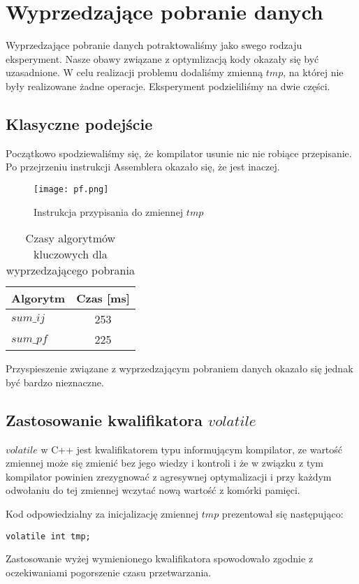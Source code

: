 \section{Wyprzedzające pobranie danych}

Wyprzedzające pobranie danych potraktowaliśmy jako swego rodzaju eksperyment. Nasze obawy związane z optymlizacją kody okazały się być uzasadnione. W celu realizacji problemu dodaliśmy zmienną $tmp$, na której nie były realizowane żadne operacje. Eksperyment podzieliliśmy na dwie części.

\subsection{Klasyczne podejście}

Początkowo spodziewaliśmy się, że kompilator usunie nic nie robiące przepisanie. Po przejrzeniu instrukcji Assemblera okazało się, że jest inaczej.

\begin{figure}[!ht]
\centering
\texttt{[image: pf.png]}
\caption{Instrukcja przypisania do zmiennej $tmp$}
\end{figure}

\begin{table}[H]
\centering
\begin{tabular}{|l|c|}
\hline
Algorytm & Czas [ms] \\ \hline
$sum\_ij$ & 253 \\ \hline
$sum\_pf$ & 225 \\ \hline
\end{tabular}
\caption{Czasy algorytmów kluczowych dla wyprzedzającego pobrania}
\end{table}

Przyspieszenie związane z wyprzedzającym pobraniem danych okazało się jednak być bardzo nieznaczne.

\subsection{Zastosowanie kwalifikatora $volatile$}

$volatile$ w C++ jest kwalifikatorem typu informującym kompilator, ze wartość zmiennej może się zmienić bez jego wiedzy i kontroli i że w związku z tym kompilator powinien zrezygnować z agresywnej optymalizacji i przy każdym odwołaniu do tej zmiennej wczytać nową wartość z komórki pamięci.\newline

Kod odpowiedzialny za inicjalizację zmiennej $tmp$ prezentował się następująco:

\begin{lstlisting}[caption=Definicja $tmp$ z użyciem volatile., captionpos=none]
volatile int tmp;
\end{lstlisting}

Zastosowanie wyżej wymienionego kwalifikatora spowodowało zgodnie z oczekiwaniami pogorszenie czasu przetwarzania.



